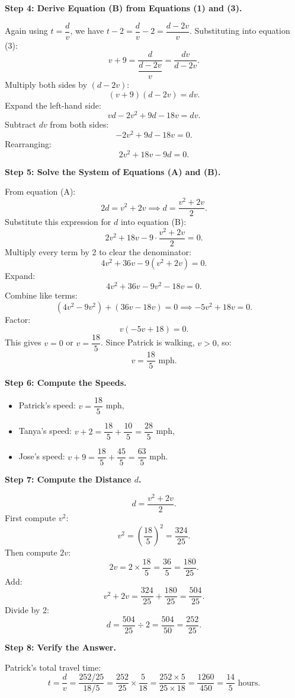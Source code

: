 \documentclass{llmxive}
\begin{document}
\begin{tcolorbox}[title=Teacher Model, breakable]
\medskip
\textbf{Step 4: Derive Equation (B) from Equations (1) and (3).}

Again using $t = \dfrac{d}{v}$, we have $t - 2 = \dfrac{d}{v} - 2 = \dfrac{d-2v}{v}$.
Substituting into equation (3):
\[
v+9 = \frac{d}{\dfrac{d-2v}{v}} = \frac{dv}{d-2v}.
\]
Multiply both sides by $(d-2v)$:
\[
(v+9)(d-2v) = dv.
\]
Expand the left-hand side:
\[
vd - 2v^2 + 9d - 18v = dv.
\]
Subtract $dv$ from both sides:
\[
-2v^2 + 9d - 18v = 0.
\]
Rearranging:
\[
2v^2 + 18v - 9d = 0. \tag{B}
\]

\medskip
\textbf{Step 5: Solve the System of Equations (A) and (B).}

From equation (A):
\[
2d = v^2 + 2v \implies d = \frac{v^2+2v}{2}.
\]
Substitute this expression for $d$ into equation (B):
\[
2v^2 + 18v - 9\cdot\frac{v^2+2v}{2} = 0.
\]
Multiply every term by 2 to clear the denominator:
\[
4v^2 + 36v - 9(v^2+2v) = 0.
\]
Expand:
\[
4v^2 + 36v - 9v^2 - 18v = 0.
\]
Combine like terms:
\[
(4v^2 - 9v^2) + (36v - 18v) = 0 \implies -5v^2 + 18v = 0.
\]
Factor:
\[
v(-5v + 18) = 0.
\]
This gives $v = 0$ or $v = \dfrac{18}{5}$. Since Patrick is walking, $v > 0$,
so:
\[
v = \frac{18}{5} \text{ mph}.
\]

\medskip
\textbf{Step 6: Compute the Speeds.}

\begin{itemize}
  \item Patrick's speed: $v = \dfrac{18}{5}$ mph,
  \item Tanya's speed: $v+2 = \dfrac{18}{5} + \dfrac{10}{5} = \dfrac{28}{5}$ mph,
  \item Jose's speed: $v+9 = \dfrac{18}{5} + \dfrac{45}{5} = \dfrac{63}{5}$ mph.
\end{itemize}

\medskip
\textbf{Step 7: Compute the Distance $d$.}

\[
d = \frac{v^2 + 2v}{2}.
\]
First compute $v^2$:
\[
v^2 = \left(\frac{18}{5}\right)^2 = \frac{324}{25}.
\]
Then compute $2v$:
\[
2v = 2 \times \frac{18}{5} = \frac{36}{5} = \frac{180}{25}.
\]
Add:
\[
v^2 + 2v = \frac{324}{25} + \frac{180}{25} = \frac{504}{25}.
\]
Divide by 2:
\[
d = \frac{504}{25} \div 2 = \frac{504}{50} = \frac{252}{25}.
\]

\medskip
\textbf{Step 8: Verify the Answer.}

Patrick's total travel time:
\[
t = \frac{d}{v} = \frac{252/25}{18/5} = \frac{252}{25} \times \frac{5}{18}
= \frac{252 \times 5}{25 \times 18} = \frac{1260}{450} = \frac{14}{5} \text{ hours}.
\]


\end{tcolorbox}
\end{document}
